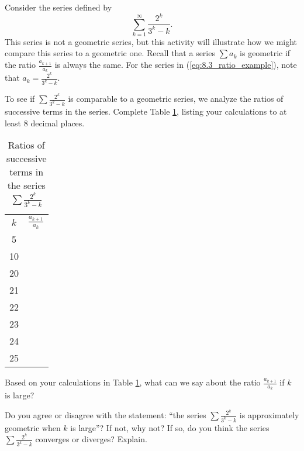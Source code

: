 \begin{activity} \label{8.3.Act8} Consider the series defined by
\begin{equation} \label{eq:8.3_ratio_example}
\sum_{k=1}^{\infty} \frac{2^k}{3^k-k}.
\end{equation}
This series is not a geometric series, but this activity will illustrate how we might compare this series to a geometric one. Recall that a series $\sum a_k$ is geometric if the ratio $\frac{a_{k+1}}{a_k}$ is always the same. For the series in (\ref{eq:8.3_ratio_example}), note that $a_k = \frac{2^k}{3^k-k}$.
\ba
\item  To see if $\sum \frac{2^k}{3^k-k}$ is comparable to a geometric series, we analyze the ratios of successive terms in the series. Complete Table \ref{T:8.3.3_ratio_test}, listing your calculations to at least 8 decimal places.
\begin{table}[ht]
\begin{center}
\renewcommand{\arraystretch}{1.5}
\begin{tabular}{c|p{2in}}
$k$   & $\frac{a_{k+1}}{a_k}$ \\
5   & \\
10   &  \\
20   &  \\
21   &  \\
22   &  \\
23  & \\
24   &  \\
25   &  \\
\end{tabular}
\caption{Ratios of successive terms in the series $\sum \frac{2^k}{3^k-k}$}
\label{T:8.3.3_ratio_test}
\end{center}
\end{table}

\item Based on your calculations in Table \ref{T:8.3.3_ratio_test}, what can we say about the ratio $\frac{a_{k+1}}{a_k}$ if $k$ is large?

\item Do you agree or disagree with the statement: ``the series $\sum \frac{2^k}{3^k-k}$ is approximately geometric when $k$ is large''? If not, why not? If so, do you think the series $\sum \frac{2^k}{3^k-k}$ converges or diverges? Explain.



\ea
\end{activity}

